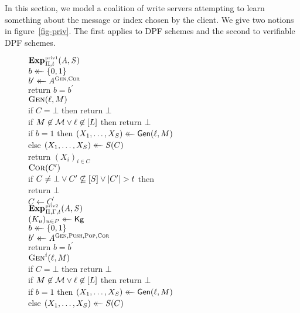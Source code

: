 %
\label{sec-security}

In this section, we model a coalition of write servers attempting to learn
something about the message or index chosen by the client. We give two notions
in figure~\ref{fig-priv}.
The first applies to DPF schemes and the second to verifiable DPF schemes.
\begin{figure}[t]
  \newcommand{\ctr}{\flagfont{ctr}}
  {
    \underline{$\game{\privone}_{\dpf,t}(\advA,\advS)$}\\[2pt]
    $b \mathrel{\leftarrow\mkern-14mu\leftarrow} \{0,1\}$\\
    $b^\prime \mathrel{\leftarrow\mkern-14mu\leftarrow} \mathit{A}^{\textsc{Gen},\textsc{Cor}}$\\
    return $b=b^\prime$
    \\[6pt]
    \underline{$\textsc{Gen}(\ell,M)$}\\[2pt]
    if $C = \bot$ then return $\bot$\\
    if $M \not\in \mathcal{M} \vee \ell \not\in [L]$ then return $\bot$\\
    if $b=1$ then $(X_1, \ldots, X_S) \mathrel{\leftarrow\mkern-14mu\leftarrow} \mathsf{Gen}(\ell,M)$\\
    else $(X_1, \ldots, X_S) \mathrel{\leftarrow\mkern-14mu\leftarrow} \mathit{S}(C)$\\
    return $(X_i)_{i\in C}$
    \\[6pt]
    \underline{$\textsc{Cor}(C^\prime)$}\\[2pt]
    if $C \ne \bot \vee C^\prime \not\subseteq [S] \vee |C^\prime| > t$
      then\\\tab return $\bot$\\
    $C \gets C^\prime$\\
  }
  {
    \underline{$\game{\privtwo}_{\dpf,\reqvfy,t}(\advA, \advS)$}\\[2pt]
    $(K_u)_{u\in P} \mathrel{\leftarrow\mkern-14mu\leftarrow} \mathsf{Kg}$\\
    $b \mathrel{\leftarrow\mkern-14mu\leftarrow} \{0,1\}$\\
    $b^\prime \mathrel{\leftarrow\mkern-14mu\leftarrow} \mathit{A}^{\textsc{Gen},\textsc{Push},\textsc{Pop},\textsc{Cor}}$\\
    return $b=b^\prime$
    \\[6pt]
    \underline{$\textsc{Gen}^i(\ell,M)$}\\[2pt]
    if $C = \bot$ then return $\bot$\\
    if $M \not\in \mathcal{M} \vee \ell \not\in [L]$ then return $\bot$\\
    if $b=1$ then $(X_1, \ldots, X_S) \mathrel{\leftarrow\mkern-14mu\leftarrow} \mathsf{Gen}(\ell,M)$\\
    else $(X_1, \ldots, X_S) \mathrel{\leftarrow\mkern-14mu\leftarrow} \mathit{S}(C)$\\
}
\end{figure}
